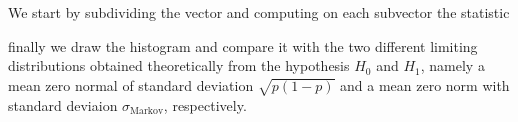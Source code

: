 	We start by subdividing the vector and computing on each subvector the statistic 
\begin{knitrout}
\color{fgcolor}\begin{kframe}
\begin{alltt}
 \hlkwb{=} 
 \hlkwb{<-}  \hldef{(} \hlopt{/} 
\end{alltt}


{\ttfamily\noindent\bfseries\color{errorcolor}{\#\# Error in split(vec, ceiling(seq\_along(vec)/chunk\_size)): oggetto 'vec' non trovato}}\begin{alltt}
 \hlkwb{<-} \hldef{(} \hldef{=} \hldef{)}
   \hlopt{:}
 \hlkwb{<-}  \hlopt{*}\hldef{(} \hlopt{-} 
\hldef{\}}
\end{alltt}


{\ttfamily\noindent\bfseries\color{errorcolor}{\#\# Error: oggetto 'chunks' non trovato}}\end{kframe}
\end{knitrout}
finally we draw the histogram and compare it with the two different limiting distributions obtained theoretically from the hypothesis $H_0$ and $H_1$, namely a mean zero normal of standard deviation $\sqrt{p(1-p)}$ and a mean zero norm with standard deviaion $\sigma_{\text{Markov}}$, respectively.  
	 
